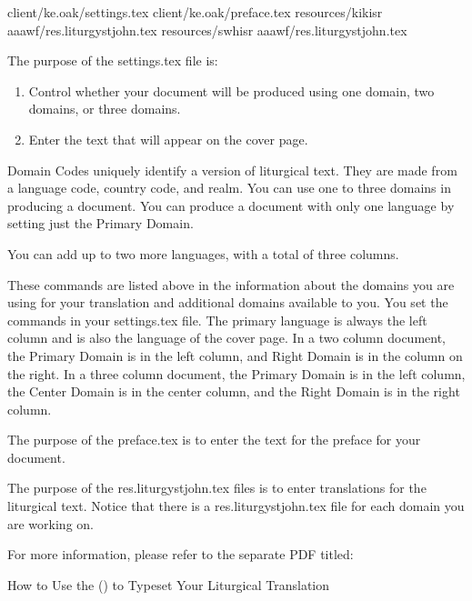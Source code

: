 \documentclass[]{memoir}
\begin{document}
\pex

\a client/ke.oak/settings.tex
\a client/ke.oak/preface.tex
\a resources/kik\textunderscore isr \textunderscore aaawf/res.liturgystjohn.tex
\a resources/swh\textunderscore isr \textunderscore aaawf/res.liturgystjohn.tex
\xe

The purpose of the settings.tex file is:
\begin{enumerate}
\item Control whether your document will be produced using one domain, two domains, or three domains.
\item Enter the text that will appear on the cover page.
\end{enumerate}

Domain Codes uniquely identify a version of liturgical text. They are made from a language code, country code, and realm. You can use one to three domains in producing a document. You can produce a document with only one language by setting just the Primary Domain. 

You can add up to two more languages, with a total of three columns. 

These commands are listed above in the information about the domains you are using for your translation and additional domains available to you. You set the commands in your settings.tex file. The primary language is always the left column and is also the language of the cover page.  In a two column document, the Primary Domain is in the left column, and Right Domain is in the column on the right.  In a three column document, the Primary Domain is in the left column, the Center Domain is in the center column, and the Right Domain is in the right column.

The purpose of the preface.tex is to enter the text for the preface for your document.

The purpose of the res.liturgystjohn.tex files is to enter translations for the liturgical text.  Notice that there is a res.liturgystjohn.tex file for each domain you are working on.

\bigskip
For more information, please refer to the separate PDF titled:
\bigskip

\noindent How to Use the \ltOcmcSystem (\ltOcmcSystemAcronymn) to Typeset Your Liturgical Translation

 
\end{document}
